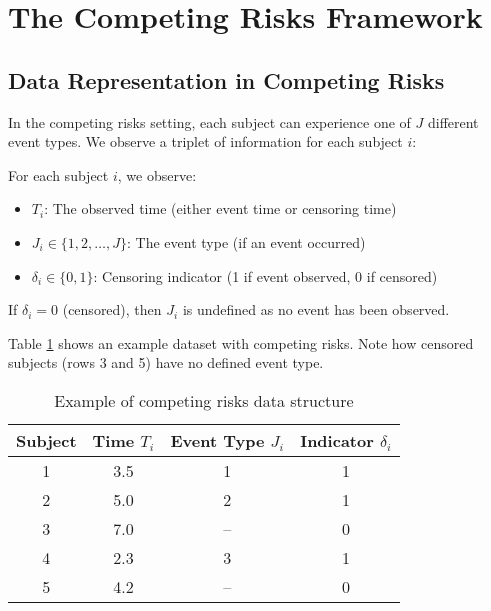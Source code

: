 \section{The Competing Risks Framework}

\subsection{Data Representation in Competing Risks}

In the competing risks setting, each subject can experience one of $J$ different event types. We observe a triplet of information for each subject $i$:

\begin{definitionbox}[title=Competing Risks Data Structure]
For each subject $i$, we observe:
\begin{itemize}
    \item $T_i$: The observed time (either event time or censoring time)
    \item $J_i \in \{1, 2, \ldots, J\}$: The event type (if an event occurred)
    \item $\delta_i \in \{0, 1\}$: Censoring indicator (1 if event observed, 0 if censored)
\end{itemize}

If $\delta_i = 0$ (censored), then $J_i$ is undefined as no event has been observed.
\end{definitionbox}

Table \ref{tab:competing-risks-data} shows an example dataset with competing risks. Note how censored subjects (rows 3 and 5) have no defined event type.

\begin{table}[htbp]
    \centering
    \caption{Example of competing risks data structure}
    \label{tab:competing-risks-data}
    \begin{tabular}{@{}cccc@{}}
        \toprule
        Subject & Time $T_i$ & Event Type $J_i$ & Indicator $\delta_i$ \\
        \midrule
        1 & 3.5 & 1 & 1 \\
        2 & 5.0 & 2 & 1 \\
        3 & 7.0 & -- & 0 \\
        4 & 2.3 & 3 & 1 \\
        5 & 4.2 & -- & 0 \\
        \bottomrule
    \end{tabular}
\end{table}

